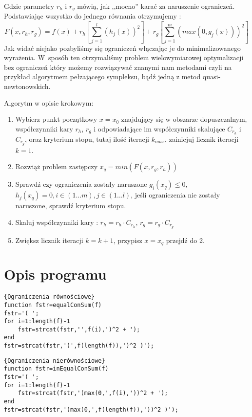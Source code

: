 \documentclass{classrep}
\begin{document}
Gdzie parametry $r_h$ i $r_g$ mówią, jak ,,mocno'' karać za naruszenie ograniczeń. Podstawiając wszystko do jednego równania otrzymujemy :
\begin{equation}
 F(x,r_h, r_g) = f(x) + r_h \left[ \sum \limits ^{l} _{j=1} (h_j(x))^{2} \right]  + r_g \left[ \sum \limits ^{m} _{j=1}
 \left( max \left( 0, g_j (x) \right) \right) ^{2} \right]
\end{equation}
Jak widać niejako pozbyliśmy się ograniczeń włączając je do minimalizowanego wyrażenia. W~sposób ten otrzymaliśmy problem wielowymiarowej optymalizacji bez ograniczeń który możemy rozwiązywać znanymi nam metodami czyli na przykład algorytmem pełzającego sympleksu, bądź jedną z metod quasi-newtonowskich.

Algorytm w opisie krokowym:
\begin{enumerate}
\item Wybierz punkt początkowy $x=x_0$ znajdujący się w obszarze dopuszczalnym, współczynniki kary $r_h$, $r_g$ i odpowiadające im współczynniki skalujące $C_{r_h}$ i $C_{r_g}$, oraz kryterium stopu, tutaj ilość iteracji $k_{max}$, zainicjuj licznik iteracji $k=1$.
\item Rozwiąż problem zastępczy   $x_q = min \left( F(x,r_g, r_h) \right)$
\item Sprawdź czy ograniczenia zostały naruszone $g_i(x_q)\leq0$, $h_j(x_q)=0, i \in \left(1 \dots m \right) , j \in \left(1 \dots l \right)$, jeśli ograniczenia nie zostały naruszone, sprawdź kryterium stopu.
\item Skaluj współczynniki kary : $r_h=r_h \cdot C_{r_h}$, $r_g=r_g \cdot C_{r_g}$
\item Zwiększ licznik iteracji $k=k+1$, przypisz $x=x_q$ przejdź do 2.
\end{enumerate}

\section{Opis programu}

\begin{lstlisting}{Ograniczenia równościowe}
function fstr=equalConSum(f)
fstr='( ';
for i=1:length(f)-1
    fstr=strcat(fstr,'',f(i),')^2 + ');
end
fstr=strcat(fstr,'(',f(length(f)),')^2 )');
\end{lstlisting}


\begin{lstlisting}{Ograniczenia nierównościowe}
function fstr=inEqualConSum(f)
fstr='( ';
for i=1:length(f)-1
    fstr=strcat(fstr,'(max(0,',f(i),'))^2 + ');
end
fstr=strcat(fstr,'(max(0,',f(length(f)),'))^2 )');
\end{lstlisting}
\end{document}
